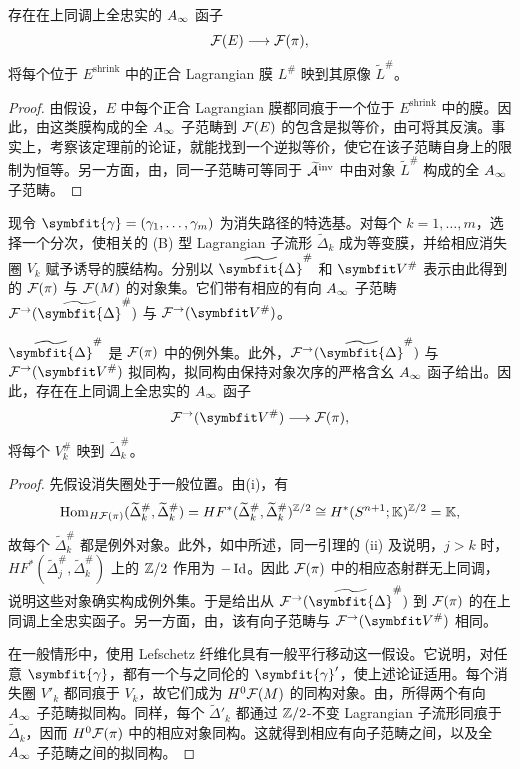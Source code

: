 \begin{proposition}\label{st:18.13}
存在在上同调上全忠实的 $A_\infty$ 函子
\[
\mathcal F(E)\longrightarrow\mathcal F(\pi),
\]
将每个位于 $E^{\mathrm{shrink}}$ 中的正合 Lagrangian 膜 $L^\#$ 映到其原像 $\widetilde L^\#$。
\end{proposition}
\begin{proof}
由假设，$E$ 中每个正合 Lagrangian 膜都同痕于一个位于 $E^{\mathrm{shrink}}$ 中的膜。因此，由这类膜构成的全 $A_\infty$ 子范畴到 $\mathcal F(E)$ 的包含是拟等价，由可将其反演。事实上，考察该定理前的论证，就能找到一个逆拟等价，使它在该子范畴自身上的限制为恒等。另一方面，由，同一子范畴可等同于 $\widetilde{\mathcal A}^{\mathrm{inv}}$ 中由对象 $\widetilde L^\#$ 构成的全 $A_\infty$ 子范畴。
\end{proof}

现令 $\symbfit{\gamma}=(\gamma_1,\ldots,\gamma_m)$ 为消失路径的特选基。对每个 $k=1,\ldots,m$，选择一个分次，使相关的 (B) 型 Lagrangian 子流形 $\widetilde\Delta_k$ 成为等变膜，并给相应消失圈 $V_k$ 赋予诱导的膜结构。分别以 $\widetilde{\symbfit{\Delta}}^{\#}$ 和 $\symbfit V^\#$ 表示由此得到的 $\mathcal F(\pi)$ 与 $\mathcal F(M)$ 的对象集。它们带有相应的有向 $A_\infty$ 子范畴 $\F^\to(\widetilde{\symbfit{\Delta}}^{\#})$ 与 $\F^\to(\symbfit V^\#)$。

\begin{proposition}\label{st:18.14}
$\widetilde{\symbfit{\Delta}}^{\#}$ 是 $\mathcal F(\pi)$ 中的例外集。此外，$\F^\to(\widetilde{\symbfit{\Delta}}^{\#})$ 与 $\F^\to(\symbfit V^\#)$ 拟同构，拟同构由保持对象次序的严格含幺 $A_\infty$ 函子给出。因此，存在在上同调上全忠实的 $A_\infty$ 函子
\[
\F^\to(\symbfit V^\#)\longrightarrow\F(\pi),
\]
将每个 $V_k^\#$ 映到 $\widetilde\Delta_k^\#$。
\end{proposition}
\begin{proof}
先假设消失圈处于一般位置。由(i)，有
\[
\operatorname{Hom}_{H\mathcal F(\pi)}(\widetilde\Delta_k^\#,\widetilde\Delta_k^\#)
=HF^*(\widetilde\Delta_k^\#,\widetilde\Delta_k^\#)^{\mathbb Z/2}
\cong H^*(S^{n+1};\mathbb K)^{\mathbb Z/2}=\mathbb K,
\]
故每个 $\widetilde\Delta_k^\#$ 都是例外对象。此外，如中所述，同一引理的 (ii) 及说明，$j>k$ 时，$HF^*(\widetilde\Delta_j^\#,\widetilde\Delta_k^\#)$ 上的 $\mathbb Z/2$ 作用为 $-\operatorname{Id}$。因此 $\mathcal F(\pi)$ 中的相应态射群无上同调，说明这些对象确实构成例外集。于是给出从 $\F^\to(\widetilde{\symbfit{\Delta}}^{\#})$ 到 $\mathcal F(\pi)$ 的在上同调上全忠实函子。另一方面，由，该有向子范畴与 $\F^\to(\symbfit V^\#)$ 相同。

在一般情形中，使用 Lefschetz 纤维化具有一般平行移动这一假设。它说明，对任意 $\symbfit{\gamma}$，都有一个与之同伦的 $\symbfit{\gamma}'$，使上述论证适用。每个消失圈 $V'_k$ 都同痕于 $V_k$，故它们成为 $H^0\mathcal F(M)$ 的同构对象。由，所得两个有向 $A_\infty$ 子范畴拟同构。同样，每个 $\widetilde\Delta'_k$ 都通过 $\mathbb Z/2$-不变 Lagrangian 子流形同痕于 $\widetilde\Delta_k$，因而 $H^0\mathcal F(\pi)$ 中的相应对象同构。这就得到相应有向子范畴之间，以及全 $A_\infty$ 子范畴之间的拟同构。
\end{proof}

